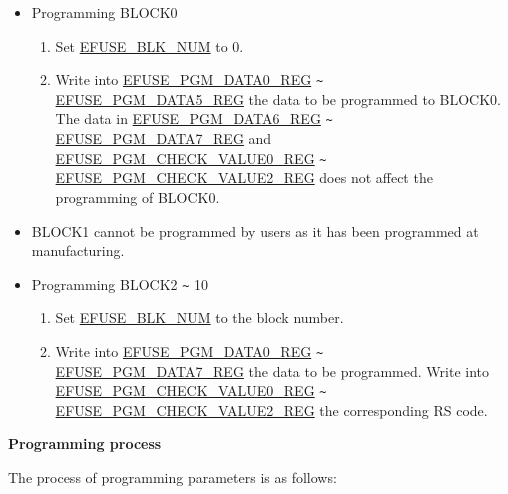 \documentclass[main\_\_EN.tex]{subfiles}
\begin{document}
\begin{itemize}
    \item Programming BLOCK0
    \begin{enumerate}
        \item Set \hyperref[fielddesc:EFUSEBLKNUM]{EFUSE\_BLK\_NUM} to 0.
        \item Write into \hyperref[regdesc:EFUSEPGMDATANREG]{EFUSE\_PGM\_DATA0\_REG} \verb+~+ \hyperref[regdesc:EFUSEPGMDATANREG]{EFUSE\_PGM\_DATA5\_REG} the data to be programmed to BLOCK0. \\
        The data in \hyperref[regdesc:EFUSEPGMDATANREG]{EFUSE\_PGM\_DATA6\_REG} \verb+~+ \hyperref[regdesc:EFUSEPGMDATANREG]{EFUSE\_PGM\_DATA7\_REG} and \hyperref[regdesc:EFUSEPGMCHECKVALUEMREG]{EFUSE\_PGM\_CHECK\_VALUE0\_REG} \verb+~+ \hyperref[regdesc:EFUSEPGMCHECKVALUEMREG]{EFUSE\_PGM\_CHECK\_VALUE2\_REG} does not affect the programming of BLOCK0.
    \end{enumerate}
    \item BLOCK1 cannot be programmed by users as it has been programmed at manufacturing.
    \item Programming BLOCK2 \verb+~+ 10
    \begin{enumerate}
        \item Set \hyperref[fielddesc:EFUSEBLKNUM]{EFUSE\_BLK\_NUM} to the block number.
        \item Write into \hyperref[regdesc:EFUSEPGMDATANREG]{EFUSE\_PGM\_DATA0\_REG} \verb+~+ \hyperref[regdesc:EFUSEPGMDATANREG]{EFUSE\_PGM\_DATA7\_REG} the data to be programmed. Write into \hyperref[regdesc:EFUSEPGMCHECKVALUEMREG]{EFUSE\_PGM\_CHECK\_VALUE0\_REG}  \verb+~+ \hyperref[regdesc:EFUSEPGMCHECKVALUEMREG]{EFUSE\_PGM\_CHECK\_VALUE2\_REG} the corresponding RS code.
    \end{enumerate}
\end{itemize}

{\bfseries Programming process}

The process of programming parameters is as follows:
\end{document}
